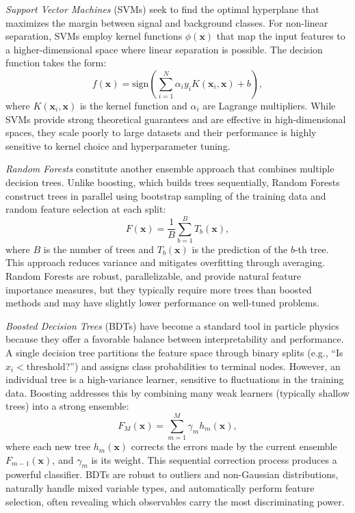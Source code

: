 \textit{Support Vector Machines} (SVMs) seek to find the optimal hyperplane that maximizes the margin between signal and background classes. For non-linear separation, SVMs employ kernel functions $\phi(\mathbf{x})$ that map the input features to a higher-dimensional space where linear separation is possible. The decision function takes the form:
\begin{equation}
f(\mathbf{x}) = \text{sign}\left(\sum_{i=1}^{N} \alpha_i y_i K(\mathbf{x}_i, \mathbf{x}) + b\right),
\end{equation}
where $K(\mathbf{x}_i, \mathbf{x})$ is the kernel function and $\alpha_i$ are Lagrange multipliers. While SVMs provide strong theoretical guarantees and are effective in high-dimensional spaces, they scale poorly to large datasets and their performance is highly sensitive to kernel choice and hyperparameter tuning.

\textit{Random Forests} constitute another ensemble approach that combines multiple decision trees. Unlike boosting, which builds trees sequentially, Random Forests construct trees in parallel using bootstrap sampling of the training data and random feature selection at each split:
\begin{equation}
F(\mathbf{x}) = \frac{1}{B} \sum_{b=1}^{B} T_b(\mathbf{x}),
\end{equation}
where $B$ is the number of trees and $T_b(\mathbf{x})$ is the prediction of the $b$-th tree. This approach reduces variance and mitigates overfitting through averaging. Random Forests are robust, parallelizable, and provide natural feature importance measures, but they typically require more trees than boosted methods and may have slightly lower performance on well-tuned problems.

\textit{Boosted Decision Trees} (BDTs) have become a standard tool in particle physics because they offer a favorable balance between interpretability and performance. A single decision tree partitions the feature space through binary splits (e.g., ``Is $x_i < \text{threshold}$?'') and assigns class probabilities to terminal nodes. However, an individual tree is a high-variance learner, sensitive to fluctuations in the training data. Boosting addresses this by combining many weak learners (typically shallow trees) into a strong ensemble:
\begin{equation}
F_M(\mathbf{x}) = \sum_{m=1}^{M} \gamma_m h_m(\mathbf{x}),
\end{equation}
where each new tree $h_m(\mathbf{x})$ corrects the errors made by the current ensemble $F_{m-1}(\mathbf{x})$, and $\gamma_m$ is its weight. This sequential correction process produces a powerful classifier. BDTs are robust to outliers and non-Gaussian distributions, naturally handle mixed variable types, and automatically perform feature selection, often revealing which observables carry the most discriminating power.

